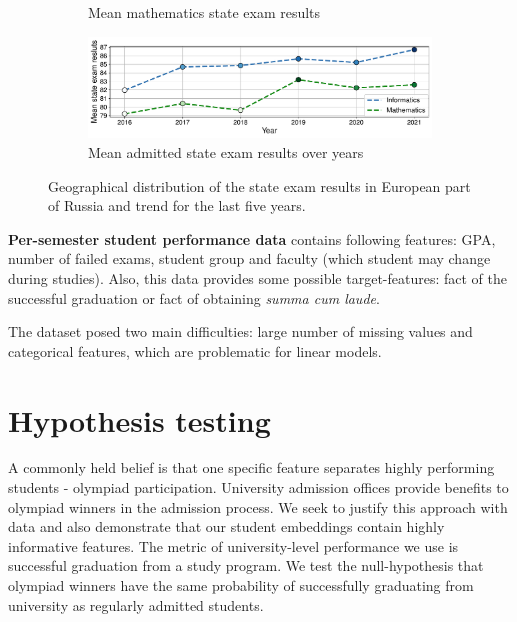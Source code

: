 \documentclass{article}
\begin{document}
\begin{figure}[t!]
\begin{subfigure}{0.49\textwidth}
    \caption{Mean mathematics state exam results}
    \label{fig:mapmath}
  \end{subfigure}
  \begin{subfigure}{0.9\textwidth}
    \includegraphics[width=\linewidth]{../gfx/ege_trend.pdf}
    \caption{Mean admitted state exam results over years}
    \label{fig:egetrend}
  \end{subfigure}\hfil
  \captionsetup{belowskip=-10pt}
  \caption{Geographical distribution of the state exam results in European part of Russia and trend for the last five years.}
\end{figure}

\textbf{Per-semester student performance data} contains following features: GPA, number of failed exams, student group and faculty (which student may change during studies). Also, this data provides some possible target-features: fact of the successful graduation or fact of obtaining \textit{summa cum laude}.


The dataset posed two main difficulties: large number of missing values and categorical features, which are problematic for linear models.



\section{Hypothesis testing}
\label{sec:hypothesis}
A commonly held belief is that one specific feature separates highly performing students - olympiad participation.
University admission offices provide benefits to olympiad winners in the admission process.
We seek to justify this approach with data and also demonstrate that our student embeddings contain highly informative features. The metric of university-level performance we use is successful graduation from a study program. We test the null-hypothesis that olympiad winners have the same probability of successfully graduating from university as regularly admitted students.
\end{document}
